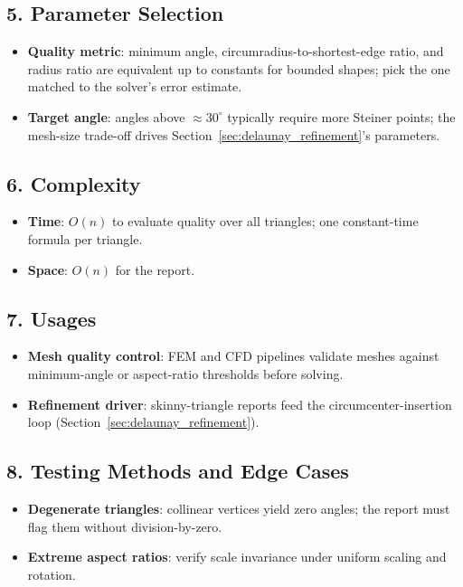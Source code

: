 \subsection{5. Parameter Selection}

\begin{itemize}
\item \textbf{Quality metric}: minimum angle, circumradius-to-shortest-edge
  ratio, and radius ratio are equivalent up to constants for bounded shapes;
  pick the one matched to the solver's error estimate.
\item \textbf{Target angle}: angles above $\approx 30^\circ$ typically require
  more Steiner points; the mesh-size trade-off drives
  Section~\ref{sec:delaunay_refinement}'s parameters.
\end{itemize}

\subsection{6. Complexity}

\begin{itemize}
\item \textbf{Time}: $O(n)$ to evaluate quality over all triangles; one
  constant-time formula per triangle.
\item \textbf{Space}: $O(n)$ for the report.
\end{itemize}

\subsection{7. Usages}

\begin{itemize}
\item \textbf{Mesh quality control}: FEM and CFD pipelines validate meshes
  against minimum-angle or aspect-ratio thresholds before solving.
\item \textbf{Refinement driver}: skinny-triangle reports feed the
  circumcenter-insertion loop (Section~\ref{sec:delaunay_refinement}).
\end{itemize}

\subsection{8. Testing Methods and Edge Cases}

\begin{itemize}
\item \textbf{Degenerate triangles}: collinear vertices yield zero angles; the
  report must flag them without division-by-zero.
\item \textbf{Extreme aspect ratios}: verify scale invariance under uniform
  scaling and rotation.
\end{itemize}

